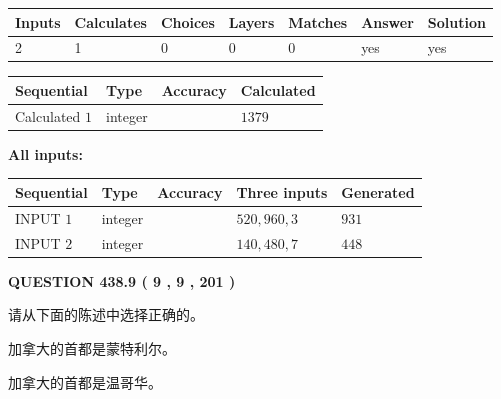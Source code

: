 \documentclass{ctexart}
\begin{document}
   
   
   
\noindent\begin{tabular}{|l|l|l|l|l|l|l|}
 \hline
Inputs & Calculates & Choices & Layers & Matches & Answer & Solution \\ \hline
 2  & 
 1  & 
 0
  & 
 0  & 
 0  & 
  yes & 
  yes 
  \\ \hline
 \end{tabular}
   
   
   
   
\noindent{}
   
   
  
  
\noindent\begin{tabular}{|l|l|l|l|}
\hline
 Sequential & Type & Accuracy & Calculated \\ 
\hline
 
 
  Calculated $  1 $ & integer &  & 
  $ 1379 $ 
 \\  \hline  
 \end{tabular}
   
   
   
   
\noindent\vspace{0.1in}\hspace{-0.08in} {\textbf{\Large{All inputs: }}}
   
   
  
  
\noindent\begin{tabular}{|l|l|l|l|l|}
\hline
 Sequential & Type & Accuracy & Three inputs & Generated \\ 
\hline
 
 
  INPUT $  1 $ & integer &  & $
 520
 , 
 960
 , 
 3
 $ & $ 931 $ 
 \\  \hline  
 
 
  INPUT $  2 $ & integer &  & $
 140
 , 
 480
 , 
 7
 $ & $ 448 $ 
 \\  \hline  
 \end{tabular}
   
   
  
\vspace{0.2in}
  
{\textbf{\Large{QUESTION
438.9 
 ( 9 , 9 , 201 )
}}}
  
  
请从下面的陈述中选择正确的。
 
 
加拿大的首都是蒙特利尔。
 
 
加拿大的首都是温哥华。
 
\end{document}
